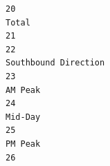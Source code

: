 \documentclass[
11pt, %
oneside, %
english, %
singlespacing, %
]{macthesis} %
\begin{document}
\begin{verbatim}
20                                                                                                                                                                                                                                                                                                                                                                                                                          Total
21                                                                                                                                                                                                                                                                                                                                                                                                                               
22                                                                                                                                                                                                                                                                                                                                                                                                           Southbound Direction
23                                                                                                                                                                                                                                                                                                                                                                                                                        AM Peak
24                                                                                                                                                                                                                                                                                                                                                                                                                        Mid-Day
25                                                                                                                                                                                                                                                                                                                                                                                                                        PM Peak
26                                                                                                                                                                                                                                                                                                                                                                                                                               

\end{verbatim}
\end{document}
